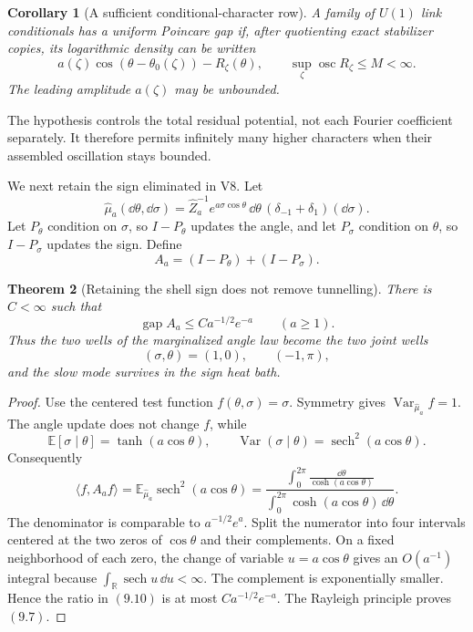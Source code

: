 \documentclass[11pt]{article}
\newtheorem{theorem}{Theorem}[section]
\newtheorem{corollary}[theorem]{Corollary}
\theoremstyle{remark}
\begin{document}
\begin{corollary}[A sufficient conditional-character row]
\label{cor:v15v9-character-row}
A family of \(U(1)\) link conditionals has a uniform Poincare gap
if, after quotienting exact stabilizer copies, its logarithmic
density can be written
\[
 a(\zeta)\cos(\theta-\theta_0(\zeta))-R_\zeta(\theta),
 \qquad
 \sup_\zeta\operatorname{osc}R_\zeta\le M<\infty.             \tag{9.4}
\]
The leading amplitude \(a(\zeta)\) may be unbounded.
\end{corollary}

The hypothesis controls the total residual potential, not each
Fourier coefficient separately.  It therefore permits infinitely
many higher characters when their assembled oscillation stays
bounded.

We next retain the sign eliminated in V8.  Let
\[
 \widehat\mu_a(\dd\theta,\dd\sigma)
 =\widehat Z_a^{-1}e^{a\sigma\cos\theta}\,
   \dd\theta\,(\delta_{-1}+\delta_1)(\dd\sigma).              \tag{9.5}
\]
Let \(P_\theta\) condition on \(\sigma\), so \(I-P_\theta\)
updates the angle, and let \(P_\sigma\) condition on \(\theta\),
so \(I-P_\sigma\) updates the sign.  Define
\[
 A_a=(I-P_\theta)+(I-P_\sigma).                              \tag{9.6}
\]

\begin{theorem}[Retaining the shell sign does not remove tunnelling]
\label{thm:v15v9-retained-sign}
There is \(C<\infty\) such that
\[
 \boxed{\operatorname{gap}A_a
 \le C a^{-1/2}e^{-a}}
 \qquad(a\ge1).                                              \tag{9.7}
\]
Thus the two wells of the marginalized angle law become the two
joint wells
\[
 (\sigma,\theta)=(1,0),\qquad(-1,\pi),                       \tag{9.8}
\]
and the slow mode survives in the sign heat bath.
\end{theorem}

\begin{proof}
Use the centered test function \(f(\theta,\sigma)=\sigma\).
Symmetry gives \(\operatorname{Var}_{\widehat\mu_a}f=1\).
The angle update does not change \(f\), while
\[
 \mathbb E[\sigma\mid\theta]=\tanh(a\cos\theta),
 \qquad
 \operatorname{Var}(\sigma\mid\theta)
 =\operatorname{sech}^2(a\cos\theta).                        \tag{9.9}
\]
Consequently
\[
 \langle f,A_af\rangle
 =\mathbb E_{\widehat\mu_a}
   \operatorname{sech}^2(a\cos\theta)
 =\frac{\displaystyle
   \int_0^{2\pi}\frac{\dd\theta}{\cosh(a\cos\theta)}}
  {\displaystyle
   \int_0^{2\pi}\cosh(a\cos\theta)\,\dd\theta}.               \tag{9.10}
\]
The denominator is comparable to \(a^{-1/2}e^a\).  Split the
numerator into four intervals centered at the two zeros of
\(\cos\theta\) and their complements.  On a fixed neighborhood
of each zero, the change of variable
\(u=a\cos\theta\) gives an \(O(a^{-1})\) integral because
\(\int_{\mathbb R}\operatorname{sech}u\,\dd u<\infty\).
The complement is exponentially smaller.  Hence the ratio in
\((9.10)\) is at most \(Ca^{-1/2}e^{-a}\).  The Rayleigh
principle proves \((9.7)\).
\end{proof}
\end{document}
